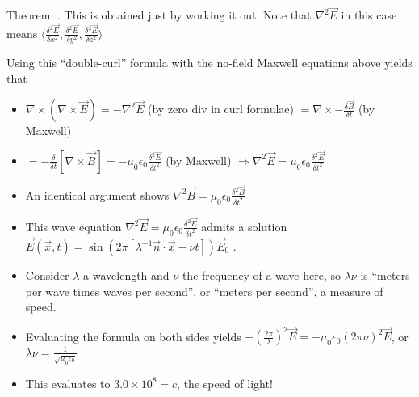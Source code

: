 \documentclass[11pt, oneside]{article}   	%
\begin{document}
Theorem: .  This is obtained just by working it out.  Note that  $\nabla^2 \vec{E}$ in this case means $\langle \frac{\delta^2 \vec{E}}{\delta x^2}, \frac{\delta^2 \vec{E}}{\delta y^2},\frac{\delta^2 \vec{E}}{\delta z^2} \rangle $

Using this ``double-curl'' formula with the no-field Maxwell equations above yields that 
\begin{itemize}
\item $\nabla \times (\nabla \times \vec{E}) = -\nabla^2 \vec{E}$ (by zero div in curl formulae)  $= \nabla \times -\frac{\delta \vec{B}}{\delta t}$ (by Maxwell)
\item $=   -\frac{\delta}{\delta t} [\nabla \times\vec{B}] = -\mu_0\epsilon_0 \frac{\delta ^2 \vec{E}}{\delta t^2}$ (by Maxwell) $\Rightarrow \nabla^2\vec{E} = \mu_0\epsilon_0 \frac{\delta ^2 \vec{E}}{\delta t^2}$
\item An identical argument shows $\nabla^2\vec{B} = \mu_0\epsilon_0 \frac{\delta ^2 \vec{B}}{\delta t^2}$
\end{itemize}

\begin{itemize}
\item This wave equation $\nabla^2\vec{E} = \mu_0\epsilon_0 \frac{\delta ^2 \vec{E}}{\delta t^2}$ admits a solution $\vec{E}(\vec{x}, t) = \sin(2\pi [\lambda^{-1} \vec{n} \cdot \vec{x} - \nu t ])\vec{E}_0$ .
\item Consider $\lambda$ a wavelength and $\nu$ the frequency of a wave here, so $\lambda \nu$ is ``meters per wave times waves per second'', or ``meters per second'', a measure of speed.
\item Evaluating the formula on both sides yields $-(\frac{2\pi}{\lambda})^2\vec{E} = -\mu_0\epsilon_0 (2\pi\nu)^2\vec{E}$, or $\lambda \nu = \frac{1}{\sqrt{\mu_0\epsilon_0}}$ 
\item This evaluates to $3.0 \times 10^8 = c$, the speed of light!
\end{itemize}
\end{document}
